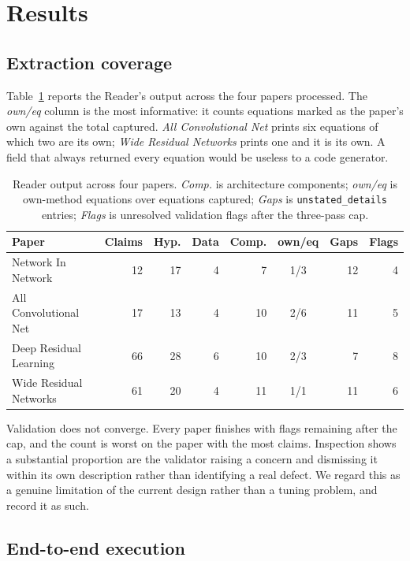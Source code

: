 \documentclass[11pt]{article}
\begin{document}
\section{Results}
\label{sec:results}

\subsection{Extraction coverage}

Table~\ref{tab:reader} reports the Reader's output across the four papers processed. The
\emph{own/eq} column is the most informative: it counts equations marked as the paper's
own against the total captured. \emph{All Convolutional Net} prints six equations of
which two are its own; \emph{Wide Residual Networks} prints one and it is its own. A
field that always returned every equation would be useless to a code generator.

\begin{table}[htbp]
\centering
\small
\caption{Reader output across four papers. \emph{Comp.} is architecture components;
\emph{own/eq} is own-method equations over equations captured; \emph{Gaps} is
\texttt{unstated\_details} entries; \emph{Flags} is unresolved validation flags after the
three-pass cap.}
\label{tab:reader}
\begin{tabular}{lrrrrcrr}
\toprule
Paper & Claims & Hyp. & Data & Comp. & own/eq & Gaps & Flags \\
\midrule
Network In Network      & 12 & 17 & 4 &  7 & 1/3 & 12 & 4 \\
All Convolutional Net   & 17 & 13 & 4 & 10 & 2/6 & 11 & 5 \\
Deep Residual Learning  & 66 & 28 & 6 & 10 & 2/3 &  7 & 8 \\
Wide Residual Networks  & 61 & 20 & 4 & 11 & 1/1 & 11 & 6 \\
\bottomrule
\end{tabular}
\end{table}

Validation does not converge. Every paper finishes with flags remaining after the cap,
and the count is worst on the paper with the most claims. Inspection shows a substantial
proportion are the validator raising a concern and dismissing it within its own
description rather than identifying a real defect. We regard this as a genuine limitation
of the current design rather than a tuning problem, and record it as such.

\subsection{End-to-end execution}
\end{document}
